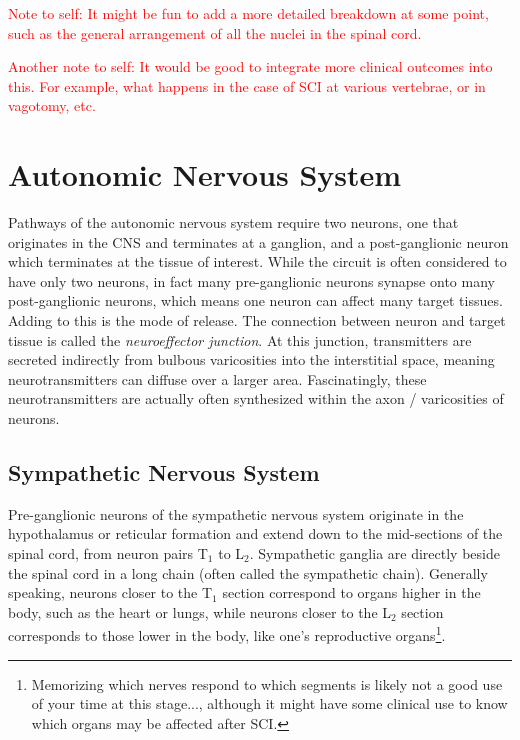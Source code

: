 \textcolor{red}{Note to self: It might be fun to add a more detailed breakdown at some point, such as the general arrangement of all the nuclei in the spinal cord.}\newline

\textcolor{red}{Another note to self: It would be good to integrate more clinical outcomes into this. For example, what happens in the case of SCI at various vertebrae, or in vagotomy, etc.}

\section{Autonomic Nervous System}

\label{sec:Autonomic}

Pathways of the autonomic nervous system require two neurons, one that originates in the CNS and terminates at a ganglion, and a post-ganglionic neuron which terminates at the tissue of interest. While the circuit is often considered to have only two neurons, in fact many pre-ganglionic neurons synapse onto many post-ganglionic neurons, which means one neuron can affect many target tissues. Adding to this is the mode of release. The connection between neuron and target tissue is called the \textit{neuroeffector junction}. At this junction, transmitters are secreted indirectly from bulbous varicosities into the interstitial space, meaning neurotransmitters can diffuse over a larger area. Fascinatingly, these neurotransmitters are actually often synthesized within the axon / varicosities of neurons. 

\subsection{Sympathetic Nervous System}
Pre-ganglionic neurons of the sympathetic nervous system originate in the hypothalamus or reticular formation and extend down to the mid-sections of the spinal cord, from neuron pairs T$_1$ to L$_2$. Sympathetic ganglia are directly beside the spinal cord in a long chain (often called the sympathetic chain). Generally speaking, neurons closer to the T$_1$ section correspond to organs higher in the body, such as the heart or lungs, while neurons closer to the L$_2$ section corresponds to those lower in the body, like one's reproductive organs\footnote{Memorizing which nerves respond to which segments is likely not a good use of your time at this stage..., although it might have some clinical use to know which organs may be affected after SCI.}.\newline

